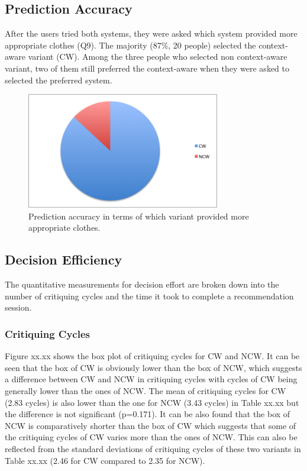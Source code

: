\subsection{Prediction Accuracy} \label{sec:results_pa}

After the users tried both systems, they were asked which system provided more appropriate clothes (Q9). The majority (87\%, 20 people) selected the context-aware variant (CW). Among the three people who selected non context-aware variant, two of them still preferred the context-aware when they were asked to selected the preferred system.

\begin{figure}[H]
	\centering
	\includegraphics[height=2in]{figures/predictionAccuracy.png}
	\caption{Prediction accuracy in terms of which variant provided more appropriate clothes.}
	\label{fig:predictionAccuracy}
\end{figure}

\subsection{Decision Efficiency} \label{sec:results_de}

The quantitative measurements for decision effort are broken down into the number of critiquing cycles and the time it took to complete a recommendation session.

\subsubsection{Critiquing Cycles} \label{sec:results_de_cc}

Figure xx.xx shows the box plot of critiquing cycles for CW and NCW. It can be seen that the box of CW is obviously lower than the box of NCW, which suggests a difference between CW and NCW in critiquing cycles with cycles of CW being generally lower than the ones of NCW. The mean of critiquing cycles for CW (2.83 cycles) is also lower than the one for NCW (3.43 cycles) in Table xx.xx but the difference is not significant (p=0.171). It can be also found that the box of NCW is comparatively shorter than the box of CW which suggests that some of the critiquing cycles of CW varies more than the ones of NCW. This can also be reflected from the standard deviations of critiquing cycles of these two variants in Table xx.xx (2.46 for CW compared to 2.35 for NCW).

